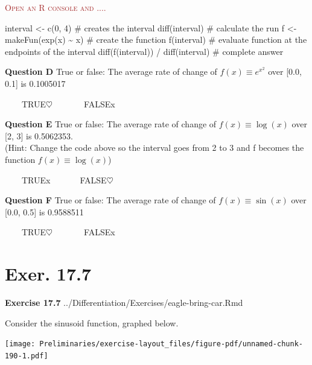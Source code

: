 \documentclass[
  letterpaper,
  DIV=11,
  numbers=noendperiod,
  oneside]{article}
\newenvironment{Shaded}{\begin{snugshade}}{\end{snugshade}}
\newcommand{\CommentTok}[1]{\textcolor[rgb]{0.37,0.37,0.37}{#1}}
\newcommand{\DecValTok}[1]{\textcolor[rgb]{0.68,0.00,0.00}{#1}}
\newcommand{\FunctionTok}[1]{\textcolor[rgb]{0.28,0.35,0.67}{#1}}
\newcommand{\NormalTok}[1]{\textcolor[rgb]{0.00,0.23,0.31}{#1}}
\newcommand{\OtherTok}[1]{\textcolor[rgb]{0.00,0.23,0.31}{#1}}
\newcommand{\SpecialCharTok}[1]{\textcolor[rgb]{0.37,0.37,0.37}{#1}}
\newenvironment{scaffolding}%
{%
\textcolor{brown}{\hrulefill}%
  \par\vspace{.3\baselineskip}%
  \textcolor{brown}{\scshape Open an R console and ....}%
  \par\vspace{\baselineskip}%
}%
{\textcolor{brown}{\hrulefill}}
\begin{document}
\begin{multicols}{2}
\begin{scaffolding}
\begin{Shaded}
\begin{Highlighting}[]
\NormalTok{interval }\OtherTok{\textless{}{-}} \FunctionTok{c}\NormalTok{(}\DecValTok{0}\NormalTok{, }\DecValTok{4}\NormalTok{)  }\CommentTok{\# creates the interval}
\FunctionTok{diff}\NormalTok{(interval)       }\CommentTok{\# calculate the run}
\NormalTok{f }\OtherTok{\textless{}{-}} \FunctionTok{makeFun}\NormalTok{(}\FunctionTok{exp}\NormalTok{(x) }\SpecialCharTok{\textasciitilde{}}\NormalTok{ x)   }\CommentTok{\#  create the function}
\FunctionTok{f}\NormalTok{(interval)     }\CommentTok{\# evaluate  function at the endpoints of  the interval}
\FunctionTok{diff}\NormalTok{(}\FunctionTok{f}\NormalTok{(interval)) }\SpecialCharTok{/} \FunctionTok{diff}\NormalTok{(interval)  }\CommentTok{\# complete answer}
\end{Highlighting}
\end{Shaded}

\end{scaffolding}

\textbf{Question D} True or false: The average rate of change of
\(f(x) \equiv e^{x^2}\) over {[}0.0, 0.1{]} is 0.1005017

~~~~{TRUE{\(\heartsuit\ \)}}~~~~~~~{FALSE{x}}

\textbf{Question E} True or false: The average rate of change of
\(f(x) \equiv \log(x)\) over {[}2, 3{]} is 0.5062353.\\
(Hint: Change the code above so the interval goes from 2 to 3 and f
becomes the function \(f(x) \equiv \log(x)\))

~~~~{TRUE{x}}~~~~~~~{FALSE{\(\heartsuit\ \)}}

\textbf{Question F} True or false: The average rate of change of
\(f(x) \equiv \sin(x)\) over {[}0.0, 0.5{]} is 0.9588511

~~~~{TRUE{\(\heartsuit\ \)}}~~~~~~~{FALSE{x}}

\hypertarget{exer.-17.7}{%
\section*{Exer. 17.7}\label{exer.-17.7}}

\textbf{Exercise 17.7} ../Differentiation/Exercises/eagle-bring-car.Rmd

Consider the sinusoid function, graphed below.

\texttt{[image: Preliminaries/exercise-layout\_files/figure-pdf/unnamed-chunk-190-1.pdf]}


\end{multicols}
\end{document}
